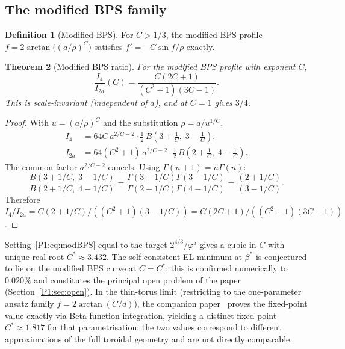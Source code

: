 \documentclass[11pt,a4paper]{article}
\newtheorem{theorem}{Theorem}[section]
\theoremstyle{definition}
\newtheorem{definition}[theorem]{Definition}
\theoremstyle{remark}
\newcommand{\vp}{\varphi}
\newcommand{\bst}{\beta^{*}}
\begin{document}
\subsection{The modified BPS family}

\begin{definition}[Modified BPS]
\label{P1:def:modified_bps}
For $C>1/3$, the modified BPS profile
$f = 2\arctan\!\bigl((a/\rho)^C\bigr)$
satisfies $f' = -C\sin f/\rho$ exactly.
\end{definition}

\begin{theorem}[Modified BPS ratio]
\label{P1:thm:modBPS}
For the modified BPS profile with exponent $C$,
\begin{equation}
  \boxed{\frac{I_4}{I_{2a}}(C)
  = \frac{C(2C+1)}{(C^2+1)(3C-1)}.}
  \label{P1:eq:modBPS}
\end{equation}
This is scale-invariant (independent of $a$), and at $C=1$ gives $3/4$.
\end{theorem}

\begin{proof}
With $u=(a/\rho)^C$ and the substitution $\rho=a/u^{1/C}$,
\begin{align*}
  I_4   &= 64C\,a^{2/C-2}\cdot\tfrac{1}{2}\,B\!\left(3+\tfrac{1}{C},\;3-\tfrac{1}{C}\right), \\
  I_{2a} &= 64(C^2+1)\,a^{2/C-2}\cdot\tfrac{1}{2}\,B\!\left(2+\tfrac{1}{C},\;4-\tfrac{1}{C}\right).
\end{align*}
The common factor $a^{2/C-2}$ cancels.  Using $\Gamma(n+1)=n\Gamma(n)$:
\[
  \frac{B(3+1/C,\;3-1/C)}{B(2+1/C,\;4-1/C)}
  = \frac{\Gamma(3+1/C)\Gamma(3-1/C)}{\Gamma(2+1/C)\Gamma(4-1/C)}
  = \frac{(2+1/C)}{(3-1/C)}.
\]
Therefore $I_4/I_{2a} = C(2+1/C)/((C^2+1)(3-1/C)) = C(2C+1)/((C^2+1)(3C-1))$.
\end{proof}

Setting~\eqref{P1:eq:modBPS} equal to the target $2^{4/3}/\vp^5$ gives a
cubic in $C$ with unique real root $C^*\approx 3.432$.  The self-consistent
EL minimum at $\bst$ is conjectured to lie on the modified BPS curve at
$C=C^*$; this is confirmed numerically to $0.020\%$ and constitutes the
principal open problem of the paper (Section~\ref{P1:sec:open}).
In the thin-torus limit (restricting to the one-parameter ansatz family
$f=2\arctan(C/d)$), the companion paper~\cite{Paper2} proves the
fixed-point value exactly via Beta-function integration, yielding a
distinct fixed point $C^*\approx 1.817$ for that parametrisation; the two
values correspond to different approximations of the full toroidal geometry
and are not directly comparable.
\end{document}
